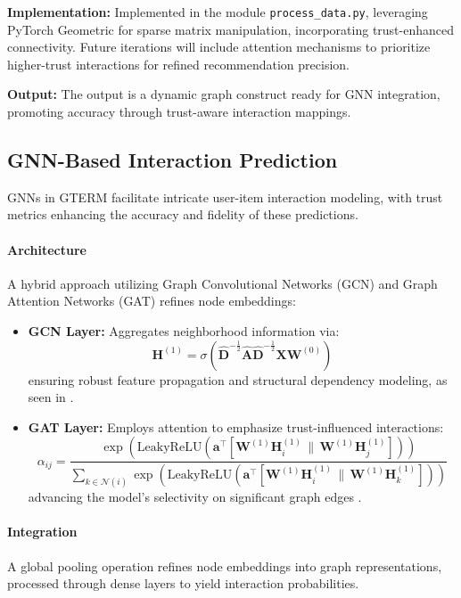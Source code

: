 \textbf{Implementation:} Implemented in the module \texttt{process\_data.py}, leveraging PyTorch Geometric for sparse matrix manipulation, incorporating trust-enhanced connectivity. Future iterations will include attention mechanisms to prioritize higher-trust interactions for refined recommendation precision.


\textbf{Output:} The output is a dynamic graph construct ready for GNN integration, promoting accuracy through trust-aware interaction mappings.

\subsection{GNN-Based Interaction Prediction}

GNNs in GTERM facilitate intricate user-item interaction modeling, with trust metrics enhancing the accuracy and fidelity of these predictions.

\paragraph{Architecture} A hybrid approach utilizing Graph Convolutional Networks (GCN) and Graph Attention Networks (GAT) refines node embeddings:

\begin{itemize}
    \item \textbf{GCN Layer:} Aggregates neighborhood information via:
    \[
    \mathbf{H}^{(1)} = \sigma(\widehat{\mathbf{D}}^{-\frac{1}{2}} \widehat{\mathbf{A}} \widehat{\mathbf{D}}^{-\frac{1}{2}} \mathbf{X} \mathbf{W}^{(0)})
    \]
    ensuring robust feature propagation and structural dependency modeling, as seen in \cite{kipf2017semisupervised}.

    \item \textbf{GAT Layer:} Employs attention to emphasize trust-influenced interactions:
    \[
    \alpha_{ij} = \frac{\exp(\text{LeakyReLU}(\mathbf{a}^\top[\mathbf{W}^{(1)} \mathbf{H}^{(1)}_i \, \| \, \mathbf{W}^{(1)} \mathbf{H}^{(1)}_j]))}{\sum_{k \in \mathcal{N}(i)} \exp(\text{LeakyReLU}(\mathbf{a}^\top[\mathbf{W}^{(1)} \mathbf{H}^{(1)}_i \, \| \, \mathbf{W}^{(1)} \mathbf{H}^{(1)}_k]))}
    \]
    advancing the model's selectivity on significant graph edges \cite{velivckovic2018graph}.
\end{itemize}

\paragraph{Integration} A global pooling operation refines node embeddings into graph representations, processed through dense layers to yield interaction probabilities.

